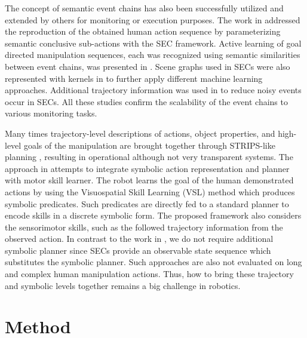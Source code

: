   

The concept of semantic event chains has also  been successfully utilized and extended by others \cite{Waechter2013,Luo2011,Vuga2014,David2014} for monitoring or execution purposes. The work in \cite{Waechter2013} addressed the reproduction of the obtained human action sequence by parameterizing semantic conclusive sub-actions with the SEC framework.
Active learning of goal directed manipulation sequences, each was recognized using semantic similarities between event chains, was presented in \cite{David2014}. Scene graphs used in SECs were also represented with kernels in \cite{Luo2011} to further apply different machine learning approaches. Additional trajectory information was used in \cite{Vuga2014} to reduce noisy events occur in SECs. All these studies confirm the scalability of the event chains to various monitoring tasks.

Many times trajectory-level descriptions of actions, object properties, and high-level goals of the manipulation are brought together through STRIPS-like planning \cite{Dillmann2010}, resulting in operational although not very transparent systems. The approach in \cite{Ahmadzadeh2015} attempts to integrate symbolic action 
representation and planner with motor skill learner. The robot learns the goal of the human demonstrated actions by using
the Visuospatial Skill Learning (VSL) method which produces symbolic predicates. Such predicates are directly fed to a standard planner to encode skills in a discrete symbolic form. The proposed framework also considers the sensorimotor skills, such as the followed trajectory information from
the observed action. 
In contrast to the work in  \cite{Ahmadzadeh2015}, we do not require additional symbolic planner since SECs provide an observable state sequence which substitutes the symbolic planner. Such approaches are also not evaluated on long and complex human manipulation actions. 
Thus, how to bring these trajectory and  symbolic levels together remains a big challenge in robotics.



\clearpage  %

 








\section{Method}
\label{sec:method}


